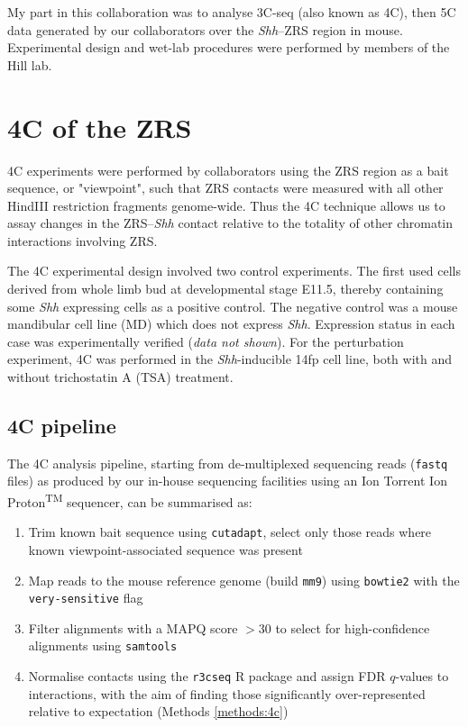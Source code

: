 \documentclass[a4paper,11pt,oneside]{book}
\begin{document}
My part in this collaboration was to analyse 3C-seq (also known as 4C), then 5C data generated by our collaborators over the \emph{Shh}--ZRS region in mouse. Experimental design and wet-lab procedures were performed by members of the Hill lab.

\section{4C of the ZRS}\label{sec:4cshh}

4C experiments were performed by collaborators using the ZRS region as a bait sequence, or "viewpoint", such that ZRS contacts were measured with all other HindIII restriction fragments genome-wide. Thus the 4C technique allows us to assay changes in the ZRS--\emph{Shh} contact relative to the totality of other chromatin interactions involving ZRS.

The 4C experimental design involved two control experiments. The first used cells derived from whole limb bud at developmental stage E11.5, thereby containing some \emph{Shh} expressing cells as a positive control. The negative control was a mouse mandibular cell line (MD) which does not express \emph{Shh}. Expression status in each case was experimentally verified (\emph{data not shown}). For the perturbation experiment, 4C was performed in the \emph{Shh}-inducible 14fp cell line, both with and without trichostatin A (TSA) treatment.

\subsection{4C pipeline}

The 4C analysis pipeline, starting from de-multiplexed sequencing reads (\texttt{fastq} files) as produced by our in-house sequencing facilities using an Ion Torrent Ion Proton\textsuperscript{TM} sequencer, can be summarised as:

\begin{enumerate}
\item Trim known bait sequence using \texttt{cutadapt},\cite{cutadapt} select only those reads where known viewpoint-associated sequence was present
\item Map reads to the mouse reference genome (build \texttt{mm9}) using \texttt{bowtie2}\cite{Langmead2012} with the \texttt{very-sensitive} flag
\item Filter alignments with a MAPQ score $>30$ to select for high-confidence alignments using \texttt{samtools}\cite{Li2009}
\item Normalise contacts using the \texttt{r3cseq} R package and assign FDR $q$-values to interactions, with the aim of finding those significantly over-represented relative to expectation (Methods \ref{methods:4c})
\end{enumerate}
\end{document}
